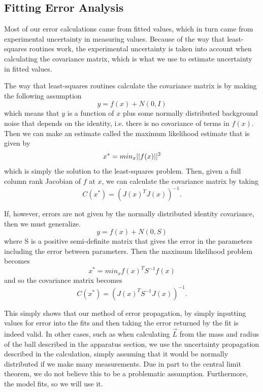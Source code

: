 \documentclass{article}
\DeclarePairedDelimiter\abs{\lvert}{\rvert}%
\begin{document}
\begin{appendices}
	\section{Fitting Error Analysis} \label{app:Fitting Error Analysis}
	Most of our error calculations came from fitted values, which in turn came from experimental uncertainty in measuring values.  Because of the way that least-squares routines work, the experimental uncertainty is taken into account when calculating the covariance matrix, which is what we use to estimate uncertainty in fitted values.

	\vspace{.25cm}

	The way that least-squares routines calculate the covariance matrix is by making the following assumption
	\begin{equation*}
		y = f(x) + N(0, I)
	\end{equation*}
	which means that $y$ is a function of $x$ plus some normally distributed background noise that depends on the identity, i.e. there is no covariance of terms in $f(x)$.  Then we can make an estimate called the maximum likelihood estimate that is given by
	\begin{equation*}
		x^* = min_x\abs{\abs{f(x)}}^2
	\end{equation*}
	which is simply the solution to the least-squares problem.  Then, given a full column rank Jacobian of $f$ at $x$, we can calculate the covariance matrix by taking
	\begin{equation*}
		C(x^*) = (J(x)^TJ(x))^{-1}.
	\end{equation*}

	If, however, errors are not given by the normally distributed identity covariance, then we must generalize.
	\begin{equation*}
		y = f(x) + N(0, S)
	\end{equation*}
	where S is a positive semi-definite matrix that gives the error in the parameters including the error between parameters.  Then the maximum likelihood problem becomes
	\begin{equation*}
		x^* = min_x f(x)^T S^{-1} f(x)
	\end{equation*}
	and so the covariance matrix becomes
	\begin{equation*}
		C(x^*) = (J(x)^T S^{-1} J(x))^{-1}.
	\end{equation*}

	\vspace{.25cm}

	This simply shows that our method of error propagation, by simply inputting values for error into the fits and then taking the error returned by the fit is indeed valid.  In other cases, such as when calculating $\vec{L}$ from the mass and radius of the ball described in the apparatus section, we use the uncertainty propagation described in the calculation, simply assuming that it would be normally distributed if we make many measurements.  Due in part to the central limit theorem, we do not believe this to be a problematic assumption.  Furthermore, the model fits, so we will use it.
\end{appendices}
\end{document}
